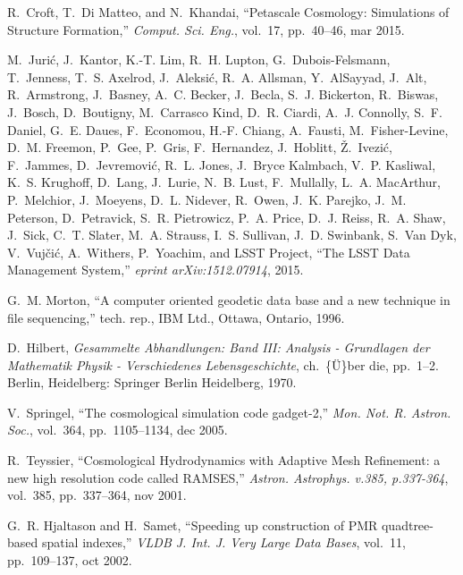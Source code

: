 \begin{thebibliography}{10}

R.~Croft, T.~{Di Matteo}, and N.~Khandai, ``{Petascale Cosmology: Simulations
  of Structure Formation},'' {\em Comput. Sci. Eng.}, vol.~17, pp.~40--46, mar
  2015.

M.~Juri{\'{c}}, J.~Kantor, K.-T. Lim, R.~H. Lupton, G.~Dubois-Felsmann,
  T.~Jenness, T.~S. Axelrod, J.~Aleksi{\'{c}}, R.~A. Allsman, Y.~AlSayyad,
  J.~Alt, R.~Armstrong, J.~Basney, A.~C. Becker, J.~Becla, S.~J. Bickerton,
  R.~Biswas, J.~Bosch, D.~Boutigny, M.~{Carrasco Kind}, D.~R. Ciardi, A.~J.
  Connolly, S.~F. Daniel, G.~E. Daues, F.~Economou, H.-F. Chiang, A.~Fausti,
  M.~Fisher-Levine, D.~M. Freemon, P.~Gee, P.~Gris, F.~Hernandez, J.~Hoblitt,
  {\v{Z}}.~Ivezi{\'{c}}, F.~Jammes, D.~Jevremovi{\'{c}}, R.~L. Jones, J.~{Bryce
  Kalmbach}, V.~P. Kasliwal, K.~S. Krughoff, D.~Lang, J.~Lurie, N.~B. Lust,
  F.~Mullally, L.~A. MacArthur, P.~Melchior, J.~Moeyens, D.~L. Nidever,
  R.~Owen, J.~K. Parejko, J.~M. Peterson, D.~Petravick, S.~R. Pietrowicz, P.~A.
  Price, D.~J. Reiss, R.~A. Shaw, J.~Sick, C.~T. Slater, M.~A. Strauss, I.~S.
  Sullivan, J.~D. Swinbank, S.~{Van Dyk}, V.~Vuj{\v{c}}i{\'{c}}, A.~Withers,
  P.~Yoachim, and {LSST Project}, ``{The LSST Data Management System},'' {\em
  eprint arXiv:1512.07914}, 2015.

G.~M. Morton, ``{A computer oriented geodetic data base and a new technique in
  file sequencing},'' tech. rep., IBM Ltd., Ottawa, Ontario, 1996.

D.~Hilbert, {\em {Gesammelte Abhandlungen: Band III: Analysis - Grundlagen der
  Mathematik Physik - Verschiedenes Lebensgeschichte}}, ch.~{\{}{\"{U}}{\}}ber
  die, pp.~1--2.
\newblock Berlin, Heidelberg: Springer Berlin Heidelberg, 1970.

V.~Springel, ``{The cosmological simulation code gadget-2},'' {\em Mon. Not. R.
  Astron. Soc.}, vol.~364, pp.~1105--1134, dec 2005.

R.~Teyssier, ``{Cosmological Hydrodynamics with Adaptive Mesh Refinement: a new
  high resolution code called RAMSES},'' {\em Astron. Astrophys. v.385,
  p.337-364}, vol.~385, pp.~337--364, nov 2001.

G.~R. Hjaltason and H.~Samet, ``{Speeding up construction of PMR quadtree-based
  spatial indexes},'' {\em VLDB J. Int. J. Very Large Data Bases}, vol.~11,
  pp.~109--137, oct 2002.


\end{thebibliography}

